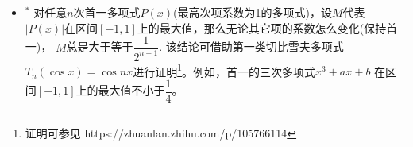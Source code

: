 \begin{itemize}[leftmargin=\inteval{\myitemleftmargin}pt,itemsep=
   \inteval{\myitemitempsep}pt,topsep=\inteval{\myitemtopsep}pt]
过三次函数对称中心的切线的方程为$ y=\left(c-\dfrac{b^2}{3a}
\right)\left(x+\dfrac{b}{3a}\right)+f\left(-\dfrac{b}{3a}\right) $. 上图中的虚线就是过对称中心的切线，切线与三次曲线将平面分为四个区域，\\
(I) 在$ A $和$ A' $区域，以及对称中心处，只能作1条切线；\\
(II) 在切线和三次曲线上(除对称中心外)，能作2条切线；\\
(III) 在$ B $和$ B' $区域能作三条切线。

\item $^*$ 对任意$ n $次首一多项式$ P(x) $(最高次项系数为1的多项式)，设$ M $代表
$ |P(x)| $在区间$ [-1,1] $上的最大值，那么无论其它项的系数怎么变化(保持首一)，
$ M $总是大于等于$ \dfrac{1}{2^{n-1}} $. 该结论可借助第一类切比雪夫多项式
$ T_n(\cos x)=\cos nx $进行证明\footnote{证明可参见
    https://zhuanlan.zhihu.com/p/105766114 }。例如，首一的三次多项式$ x^3+ax+b $
在区间$ [-1,1] $上的最大值不小于$ \dfrac{1}{4} $。\\

\end{itemize}

